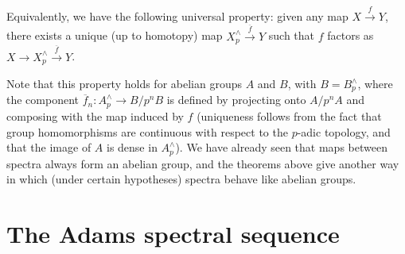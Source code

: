 \documentclass[11pt, titlepage]{article} %
\def\subq{\ensuremath\subseteq}
\def\inte{\ensuremath\mathbb{Z}}
\numberwithin{equation}{subsection}
\theoremstyle{plain}
\theoremstyle{definition}
\begin{document}
Equivalently, we have the following universal property: given any map \(X \xrightarrow{f} Y\), there exists a unique (up to homotopy) map \(X^\wedge_p \xrightarrow{\overline f} Y\) such that \(f\) factors as \(X \to X^\wedge_p \xrightarrow{\overline f} Y\). 

Note that this property holds for abelian groups \(A\) and \(B\), with \(B=B^\wedge_p\), where the component \(\overline f_n : A^\wedge_p\to B/p^nB\) is defined by projecting onto \(A/p^nA\) and composing with the map induced by \(f\) (uniqueness follows from the fact that group homomorphisms are continuous with respect to the \(p\)-adic topology, and that the image of \(A\) is dense in \(A^\wedge_p\)).
We have already seen that maps between spectra always form an abelian group, and the theorems above give another way in which (under certain hypotheses) spectra behave like abelian groups. 

\section{The Adams spectral sequence}
\end{document}
